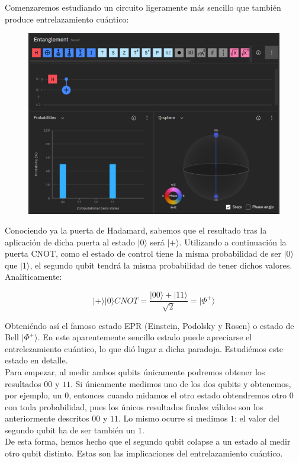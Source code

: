 \documentclass[11pt]{article}
\newcommand{\ra}{\rangle}
\theoremstyle{plain}
\begin{document}
Comenzaremos estudiando un circuito ligeramente más sencillo que también produce entrelazamiento cuántico:

\begin{figure}[H]
	\centering
	\includegraphics[scale=0.6]{figures/entanglement.png}
\end{figure}

Conociendo ya la puerta de Hadamard, sabemos que el resultado tras la aplicación de dicha puerta al estado $|0\ra$ será $|+\ra$. Utilizando a continuación la puerta CNOT, como el estado de control tiene la misma probabilidad de ser $|0\ra$ que $|1\ra$, el segundo qubit tendrá la misma probabilidad de tener dichos valores. Analíticamente:

\[
	|+\ra|0\ra CNOT = \frac{|00\ra + |11\ra}{\sqrt 2} = |\Phi^+\ra
\]

Obteniéndo así el famoso estado EPR (Einstein, Podolsky y Rosen) o estado de Bell $|\Phi^+\ra$. En este aparentemente sencillo estado puede apreciarse el entrelezamiento cuántico, lo que dió lugar a dicha paradoja. Estudiémos este estado en detalle. \\

Para empezar, al medir ambos qubits únicamente podremos obtener los resultados $00$ y $11$. Si únicamente medimos uno de los dos qubits y obtenemos, por ejemplo, un $0$, entonces cuando midamos el otro estado obtendremos otro $0$ con toda probabilidad, pues los únicos resultados finales válidos son los anteriormente descritos $00$ y $11$. Lo mismo ocurre si medimos $1$: el valor del segundo qubit ha de ser también un $1$. \\

De esta forma, hemos hecho que el segundo qubit colapse a un estado al medir otro qubit distinto. Estas son las implicaciones del entrelazamiento cuántico. \\
\end{document}
